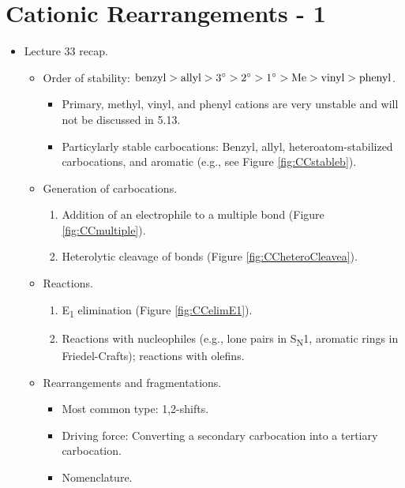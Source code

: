 \documentclass[../notes.tex]{subfiles}
\begin{document}
\section{Cationic Rearrangements - 1}
\begin{itemize}
    \item {}Lecture 33 recap.
    \begin{itemize}
        \item Order of stability: $
            \text{benzyl} > \text{allyl} > 3^\circ > 2^\circ > 1^\circ > \ce{Me} > \text{vinyl} > \text{phenyl}
        $.
        \begin{itemize}
            \item Primary, methyl, vinyl, and phenyl cations are very unstable and will not be discussed in 5.13.
            \item Particylarly stable carbocations: Benzyl, allyl, heteroatom-stabilized carbocations, and aromatic (e.g., see Figure \ref{fig:CCstableb}).
        \end{itemize}
        \item Generation of carbocations.
        \begin{enumerate}[label={\arabic*)}]
            \item Addition of an electrophile to a multiple bond (Figure \ref{fig:CCmultiple}).
            \item Heterolytic cleavage of  bonds (Figure \ref{fig:CCheteroCleavea}).
        \end{enumerate}
        \item Reactions.
        \begin{enumerate}[label={\arabic*)}]
            \item E\textsubscript{1} elimination (Figure \ref{fig:CCelimE1}).
            \item Reactions with nucleophiles (e.g., lone pairs in S\textsubscript{N}1, aromatic rings in Friedel-Crafts); reactions with olefins.
        \end{enumerate}
        \item Rearrangements and fragmentations.
        \begin{itemize}
            \item Most common type: 1,2-shifts.
            \item Driving force: Converting a secondary carbocation into a tertiary carbocation.
            \item Nomenclature.
            \begin{itemize}

\end{itemize}
\end{itemize}
\end{itemize}
\end{itemize}
\end{document}
